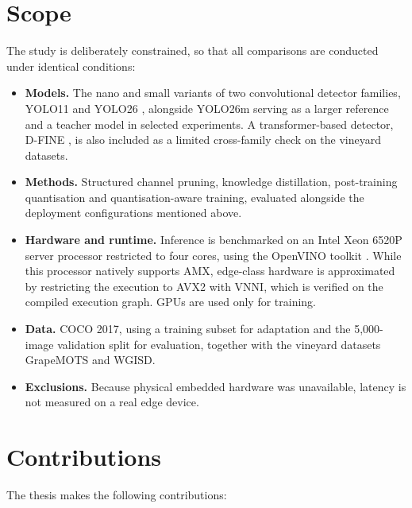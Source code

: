 \documentclass[a4paper,11pt,twoside]{report}
\theoremstyle{definition}
\begin{document}
\section{Scope}
\label{sec:intro_scope}

The study is deliberately constrained, so that all comparisons are conducted under identical conditions:

\begin{itemize}
    \item \textbf{Models.} The nano and small variants of two convolutional detector families, YOLO11 and YOLO26 \cite{UltralyticsYOLO11, UltralyticsYOLO26}, alongside YOLO26m serving as a larger reference and a teacher model in selected experiments. A transformer-based detector, D-FINE \cite{Peng2024DFINE}, is also included as a limited cross-family check on the vineyard datasets.
    \item \textbf{Methods.} Structured channel pruning, knowledge distillation, post-training quantisation and quantisation-aware training, evaluated alongside the deployment configurations mentioned above.
    \item \textbf{Hardware and runtime.} Inference is benchmarked on an Intel Xeon 6520P server processor restricted to four cores, using the OpenVINO toolkit \cite{OpenVINO}. While this processor natively supports AMX, edge-class hardware is approximated by restricting the execution to AVX2 with VNNI, which is verified on the compiled execution graph. GPUs are used only for training.
    \item \textbf{Data.} COCO 2017, using a training subset for adaptation and the 5,000-image validation split for evaluation, together with the vineyard datasets GrapeMOTS and WGISD.
    \item \textbf{Exclusions.} Because physical embedded hardware was unavailable, latency is not measured on a real edge device.
\end{itemize}

\section{Contributions}
\label{sec:intro_contributions}

The thesis makes the following contributions:
\end{document}
